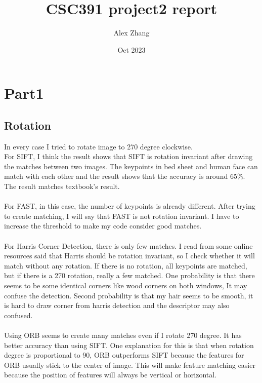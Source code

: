 \documentclass{article}
\title{CSC391 project2 report}
\author{Alex Zhang}
\date{Oct 2023}
\begin{document}
\maketitle
\section*{Part1}
\subsection*{Rotation}
In every case I tried to rotate image to 270 degree clockwise.\\
For SIFT, I think the result shows that SIFT is rotation invariant after drawing the matches between two images.
The keypoints in bed sheet and human face can match with each other and the result shows that the accuracy is around 65\%.
The result matches textbook's result.\\
\\
For FAST, in this case, the number of keypoints is already different.
After trying to create matching, I will say that FAST is not rotation invariant.
I have to increase the threshold to make my code consider good matches.\\
\\
For Harris Corner Detection, there is only few matches.
I read from some online resources said that Harris should be rotation invariant, so I check whether it will match without any rotation.
If there is no rotation, all keypoints are matched, but if there is a 270 rotation, really a few matched.
One probability is that there seems to be some identical corners like wood corners on both windows, It may confuse the detection.
Second probability is that my hair seems to be smooth, it is hard to draw corner from harris detection and the descriptor may also confused.\\
\\
Using ORB seems to create many matches even if I rotate 270 degree.
It has better accuracy than using SIFT.
One explanation for this is that when rotation degree is proportional to 90, ORB outperforms SIFT because the features for ORB usually stick to the center of image.
This will make feature matching easier because the position of features will always be vertical or horizontal.
\end{document}
